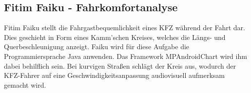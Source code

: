 	\subsection{Fitim Faiku - Fahrkomfortanalyse}
	 Fitim Faiku stellt die Fahrgastbequemlichkeit eines KFZ während der Fahrt dar.
	 Dies geschieht in Form eines Kamm'schen Kreises, welches die Längs- und Querbeschleunigung anzeigt. Faiku wird für diese Aufgabe die Programmiersprache Java anwenden.
	 Das Framework MPAndroidChart wird ihm dabei behilflich sein. Bei kurvigen Straßen schlägt der Kreis aus, wodurch der KFZ-Fahrer auf eine Geschwindigkeitsanpassung audiovisuell aufmerksam gemacht wird.

\clearpage %